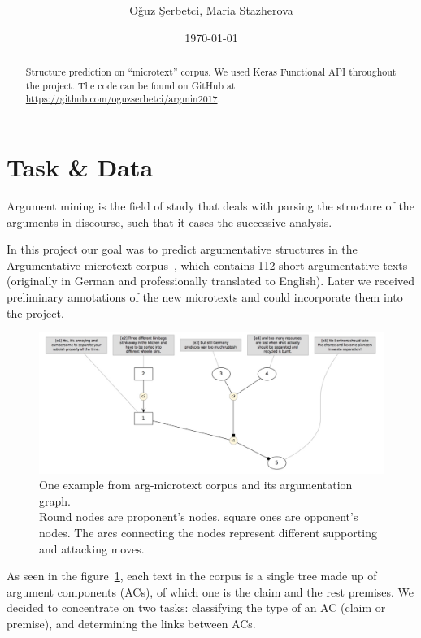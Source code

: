 \documentclass[onecolumn]{article}
\title{\spacecaps{Project module report: Argumentation Mining }\\
       \normalsize\spacesc{University of Potsdam, Winter semester 2017/18}}
\author{Oğuz Şerbetci, Maria Stazherova}
\date{\today}
\begin{document}
\maketitle

\begin{abstract}

Structure prediction on ``microtext'' corpus. We used Keras Functional API throughout the project. The code can be found on GitHub at \url{https://github.com/oguzserbetci/argmin2017}.

\end{abstract}


\section{Task \& Data}
Argument mining is the field of study that deals with parsing the structure of the arguments in discourse, such that it eases the successive analysis.

In this project our goal was to predict argumentative structures in the
Argumentative microtext corpus~\cite{peldszus2015annotated}, which contains 112 short argumentative texts
(originally in German and professionally translated to English). Later we received preliminary annotations of the new microtexts
and could incorporate them into the project.

\begin{figure}[h]
    \centering
    \includegraphics[width=0.8\linewidth]{fig/microtext.jpg}
    \caption{One example from arg-microtext corpus and its argumentation graph.
            \\Round nodes are proponent's nodes, square ones are opponent's nodes.
            The arcs connecting the nodes represent different supporting and attacking moves.}\label{fig:microtext}
\end{figure}

As seen in the figure~\ref{fig:microtext}, each text in the corpus is a single tree made up of argument components (ACs), of which one is the claim and the rest premises.
We decided to concentrate on two tasks: classifying the type of an AC (claim or premise), and determining the links between ACs.
\end{document}
